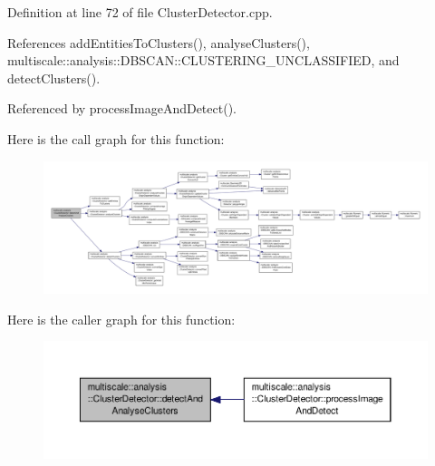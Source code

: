 Definition at line 72 of file Cluster\-Detector.\-cpp.



References add\-Entities\-To\-Clusters(), analyse\-Clusters(), multiscale\-::analysis\-::\-D\-B\-S\-C\-A\-N\-::\-C\-L\-U\-S\-T\-E\-R\-I\-N\-G\-\_\-\-U\-N\-C\-L\-A\-S\-S\-I\-F\-I\-E\-D, and detect\-Clusters().



Referenced by process\-Image\-And\-Detect().



Here is the call graph for this function\-:
\nopagebreak
\begin{figure}[H]
\begin{center}
\leavevmode
\includegraphics[width=350pt]{classmultiscale_1_1analysis_1_1ClusterDetector_a46f98e066e74171774f0b6728118bc7b_cgraph}
\end{center}
\end{figure}




Here is the caller graph for this function\-:
\nopagebreak
\begin{figure}[H]
\begin{center}
\leavevmode
\includegraphics[width=350pt]{classmultiscale_1_1analysis_1_1ClusterDetector_a46f98e066e74171774f0b6728118bc7b_icgraph}
\end{center}
\end{figure}


